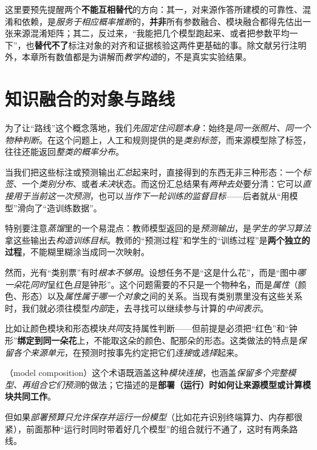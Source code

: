 这里要预先提醒两个\textbf{不能互相替代}的方向：其一，对来源作答所建模的可靠性、混淆和依赖，是\emph{服务于相应概率推断}的，\textbf{并非}所有参数融合、模块融合都得先估出一张来源混淆矩阵；其二，反过来，“我能把几个模型跑起来、或者把参数平均一下”，也\textbf{替代不了}标注对象的对齐和证据核验这两件更基础的事。除文献另行注明外，本章所有数值都是为讲解而\emph{教学构造}的，不是真实实验结果。

\section{知识融合的对象与路线}
\label{sec:knowledge-fusion-routes}
\label{sec:ket-integration-composition}

为了让“路线”这个概念落地，我们\emph{先固定住问题本身}：始终是\emph{同一张照片、同一个物种判断}。在这个问题上，人工和规则提供的是\emph{类别标签}，而来源模型除了标签，往往还能返回\emph{整类的概率分布}。

当我们把这些标注或预测输出\emph{汇总}起来时，直接得到的东西无非三种形态：一个\emph{标签}、一个\emph{类别分布}、或者\emph{未决}状态。而这份汇总结果有\emph{两种去处}要分清：它可以\emph{直接用于当前这一次预测}，也可以\emph{当作下一轮训练的监督目标}——后者就从“用模型”滑向了“造训练数据”。

特别要注意\emph{蒸馏}里的一个易混点：教师模型返回的是\emph{预测输出}，是\emph{学生的学习算法}拿这些输出去\emph{构造训练目标}。教师的“预测过程”和学生的“训练过程”是\textbf{两个独立的过程}，不能糊里糊涂当成同一次映射。

然而，光有“类别票”有时\emph{根本不够用}。设想任务不是“这是什么花”，而是“图中\emph{哪一朵}花\emph{同时}呈红色\emph{且}是钟形”。这个问题需要的不只是一个物种名，而是\emph{属性}（颜色、形态）以及\emph{属性属于哪一个对象}之间的关系。当现有类别票里没有这些关系时，我们就必须往模型\emph{内部}走，去寻找可以继续参与计算的\emph{中间表示}。

比如让颜色模块和形态模块\emph{共同}支持属性判断——但前提是必须把“红色”和“钟形”\textbf{绑定到同一朵花}上，不能取这朵的颜色、配那朵的形态。这类做法的特点是\emph{保留各个来源单元}，在预测时按事先约定把它们\emph{连接}或\emph{选择}起来。

（model composition）这个术语既涵盖这种\emph{模块连接}，也涵盖\emph{保留多个完整模型、再组合它们预测}的做法；它描述的是\textbf{部署（运行）时如何让来源模型或计算模块共同工作}。

但如果\emph{部署预算只允许保存并运行一份模型}（比如花卉识别终端算力、内存都很紧），前面那种“运行时同时带着好几个模型”的组合就行不通了，这时有两条路线。

